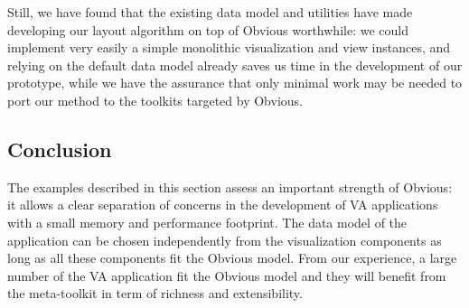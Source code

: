 Still, we have found that the existing data model and utilities have
made developing our layout algorithm on top of Obvious worthwhile: we
could implement very easily a simple monolithic visualization and
view instances, and relying on the default data model already saves us
time in the development of our prototype, while we have the assurance
that only minimal work may be needed to port our method to the
toolkits targeted by Obvious.


\subsection{Conclusion}

The examples described in this section assess an important strength of
Obvious: it allows a clear separation of concerns in the development
of VA applications with a small memory and performance footprint.  The
data model of the application can be chosen independently from the
visualization components as long as all these components fit the
Obvious model.  From our experience, a large number of the VA
application fit the Obvious model and they will benefit from the
meta-toolkit in term of richness and extensibility.

